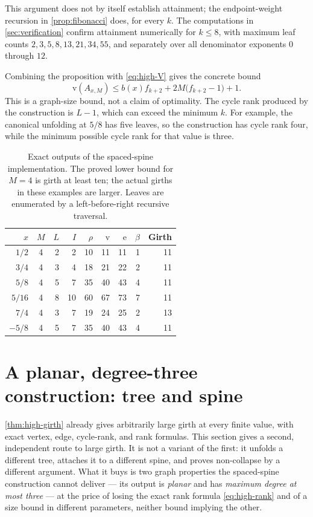 \documentclass[11pt,a4paper]{article}
\numberwithin{equation}{section}
\theoremstyle{definition}
\theoremstyle{remark}
\newcommand{\rk}{\rho}
\newcommand{\sizeV}{\mathrm{v}}
\newcommand{\sizeE}{\mathrm{e}}
\begin{document}
This argument does not by itself establish attainment; the endpoint-weight
recursion in \cref{prop:fibonacci} does, for every $k$. The computations in
\cref{sec:verification} confirm attainment numerically for $k\leq8$, with
maximum leaf counts $2,3,5,8,13,21,34,55$, and separately over all denominator
exponents $0$ through $12$.

Combining the proposition with \eqref{eq:high-V} gives the concrete bound
\begin{equation}
\label{eq:output-bound}
 \sizeV(A_{x,M})
 \leq b(x)f_{k+2}+2M\bigl(f_{k+2}-1\bigr)+1.
\end{equation}
This is a graph-size bound, not a claim of optimality. The cycle rank produced
by the construction is $L-1$, which can exceed the minimum $k$. For example,
the canonical unfolding at $5/8$ has five leaves, so the construction has cycle
rank four, while the minimum possible cycle rank for that value is three.

\begin{table}[htbp]
\centering
\begin{tabular}{@{}rcrrrrrrr@{}}
\toprule
$x$ & $M$ & $L$ & $I$ & $\rk$ & $\sizeV$ & $\sizeE$ & $\beta$ & Girth\\
\midrule
$1/2$  &4&2&2&10&11&11&1&11\\
$3/4$  &4&3&4&18&21&22&2&11\\
$5/8$  &4&5&7&35&40&43&4&11\\
$5/16$ &4&8&10&60&67&73&7&11\\
$7/4$  &4&3&7&19&24&25&2&13\\
$-5/8$ &4&5&7&35&40&43&4&11\\
\bottomrule
\end{tabular}
\caption{Exact outputs of the spaced-spine implementation. The proved lower
bound for $M=4$ is girth at least ten; the actual girths in these examples are
larger. Leaves are enumerated by a left-before-right recursive traversal.}
\label{tab:high}
\end{table}

\section{A planar, degree-three construction: tree and spine}
\label{sec:sparse}

\cref{thm:high-girth} already gives arbitrarily large girth at every finite
value, with exact vertex, edge, cycle-rank, and rank formulas. This section
gives a second, independent route to large girth. It is not a variant of the
first: it unfolds a different tree, attaches it to a different spine, and proves
non-collapse by a different argument. What it buys is two graph properties the
spaced-spine construction cannot deliver --- its output is \emph{planar} and has
\emph{maximum degree at most three} --- at the price of losing the exact rank
formula \eqref{eq:high-rank} and of a size bound in different parameters, neither
bound implying the other.
\end{document}
